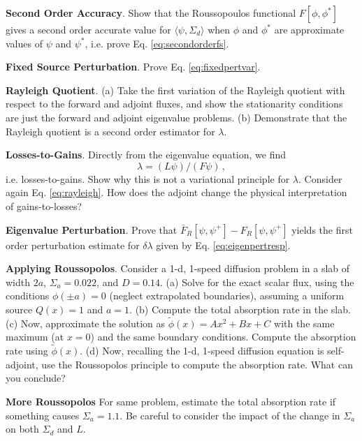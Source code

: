 \begin{exercises}

  \item \textbf{Second Order Accuracy}. Show that the Roussopoulos functional $F[\phi,\phi^*]$ gives a second order accurate value for $\langle \psi,\Sigma_d \rangle$ when $\phi$ and $\phi^*$ are approximate values of $\psi$ and $\psi^*$, i.e. prove Eq. \ref{eq:secondorderfs}.

  \item \textbf{Fixed Source Perturbation}. Prove Eq. \ref{eq:fixedpertvar}.
 
  \item \textbf{Rayleigh Quotient}. (a) Take the first variation of the Rayleigh quotient with respect to the forward and adjoint fluxes, and show the stationarity conditions are just the forward and adjoint eigenvalue problems.  (b) Demonstrate that the Rayleigh quotient is a second order estimator for $\lambda$.

  \item \textbf{Losses-to-Gains}. Directly from the eigenvalue equation, we find 
  \begin{equation*}
    \lambda = (L\psi)/(F\psi) \, ,
  \end{equation*}
  i.e. losses-to-gains.  Show why this is not a variational principle for $\lambda$.  Consider again Eq. \ref{eq:rayleigh}.  How does the adjoint change the physical interpretation of gains-to-losses?

  \item  \textbf{Eigenvalue Perturbation}. Prove that $\bar{F}_R[\psi,\psi^+]-F_R[\psi,\psi^+]$ yields the first order perturbation estimate for $\delta \lambda$ given by Eq. \ref{eq:eigenpertresp}.

  \item  \textbf{Applying Roussopolos}. Consider a 1-d, 1-speed diffusion problem in a slab of width $2a$, $\Sigma_a = 0.022$, and $D = 0.14$. (a) Solve for the exact scalar flux, using the conditions $\phi(\pm a)=0$ (neglect extrapolated boundaries), assuming a uniform source $Q(x) = 1$ and $a=1$.  (b) Compute the total absorption rate in the slab.  (c) Now, approximate the solution as $\tilde{\phi}(x) = Ax^2 + Bx +C$ with the same maximum (at $x=0$) and the same boundary conditions.  Compute the absorption rate  using $\tilde{\phi}(x)$. (d) Now, recalling the 1-d, 1-speed diffusion equation is self-adjoint, use the Roussopolos principle to compute the absorption rate.  What can you conclude? 

  \item \textbf{More Roussopolos} For same problem, estimate the total absorption rate if something causes $\Sigma_a = 1.1$.  Be careful to consider the impact of the change in $\Sigma_a$ on both $\Sigma_d$ and $L$.

\end{exercises}